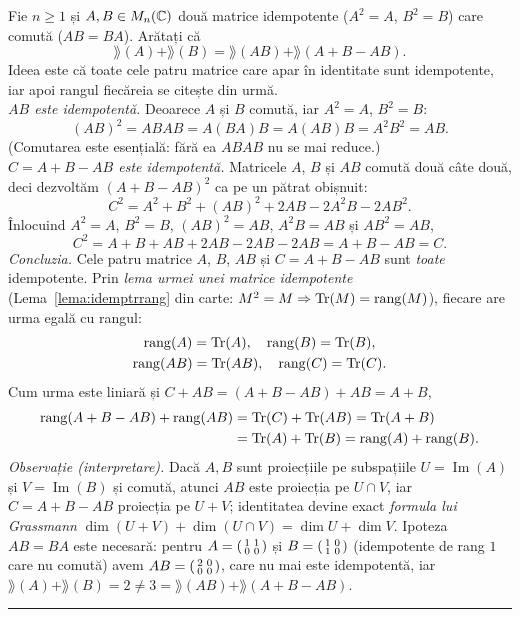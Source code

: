 Fie $n\ge1$ și $A,B\in M_n(\mathbb{C})$ două matrice idempotente ($A^2=A$, $B^2=B$) care comută ($AB=BA$). Arătați că
\[ \rang(A)+\rang(B)=\rang(AB)+\rang(A+B-AB). \]
\sol Ideea este că toate cele patru matrice care apar în identitate sunt idempotente, iar apoi rangul fiecăreia se citește din urmă.\\[2pt]
\emph{$AB$ este idempotentă.} Deoarece $A$ și $B$ comută, iar $A^2=A$, $B^2=B$:
\[ (AB)^2=ABAB=A(BA)B=A(AB)B=A^2B^2=AB. \]
(Comutarea este esențială: fără ea $ABAB$ nu se mai reduce.)\\[2pt]
\emph{$C=A+B-AB$ este idempotentă.} Matricele $A$, $B$ și $AB$ comută două câte două, deci dezvoltăm $(A+B-AB)^2$ ca pe un pătrat obișnuit:
\[ C^2=A^2+B^2+(AB)^2+2AB-2A^2B-2AB^2. \]
Înlocuind $A^2=A$, $B^2=B$, $(AB)^2=AB$, $A^2B=AB$ și $AB^2=AB$,
\[ C^2=A+B+AB+2AB-2AB-2AB=A+B-AB=C. \]
\emph{Concluzia.} Cele patru matrice $A$, $B$, $AB$ și $C=A+B-AB$ sunt \emph{toate} idempotente. Prin \emph{lema urmei unei matrice idempotente} (Lema~\ref{lema:idemptrrang} din carte: $M^2=M\Rightarrow\operatorname{Tr}(M)=\operatorname{rang}(M)$), fiecare are urma egală cu rangul:
\[ \begin{gathered} \operatorname{rang}(A)=\operatorname{Tr}(A),\quad \operatorname{rang}(B)=\operatorname{Tr}(B),\\ \operatorname{rang}(AB)=\operatorname{Tr}(AB),\quad \operatorname{rang}(C)=\operatorname{Tr}(C). \end{gathered} \]
Cum urma este liniară și $C+AB=(A+B-AB)+AB=A+B$,
\[ \begin{aligned} \operatorname{rang}(A+B-AB)+\operatorname{rang}(AB)&=\operatorname{Tr}(C)+\operatorname{Tr}(AB)=\operatorname{Tr}(A+B)\\ &=\operatorname{Tr}(A)+\operatorname{Tr}(B)=\operatorname{rang}(A)+\operatorname{rang}(B). \end{aligned} \]
\emph{Observație (interpretare).} Dacă $A,B$ sunt proiecțiile pe subspațiile $U=\operatorname{Im}(A)$ și $V=\operatorname{Im}(B)$ și comută, atunci $AB$ este proiecția pe $U\cap V$, iar $C=A+B-AB$ proiecția pe $U+V$; identitatea devine exact \emph{formula lui Grassmann} $\dim(U+V)+\dim(U\cap V)=\dim U+\dim V$. Ipoteza $AB=BA$ este necesară: pentru $A=\begin{psmallmatrix}1&1\\0&0\end{psmallmatrix}$ și $B=\begin{psmallmatrix}1&0\\1&0\end{psmallmatrix}$ (idempotente de rang $1$ care nu comută) avem $AB=\begin{psmallmatrix}2&0\\0&0\end{psmallmatrix}$, care nu mai este idempotentă, iar $\rang(A)+\rang(B)=2\neq3=\rang(AB)+\rang(A+B-AB)$.
\vspace{1mm}\hrule

